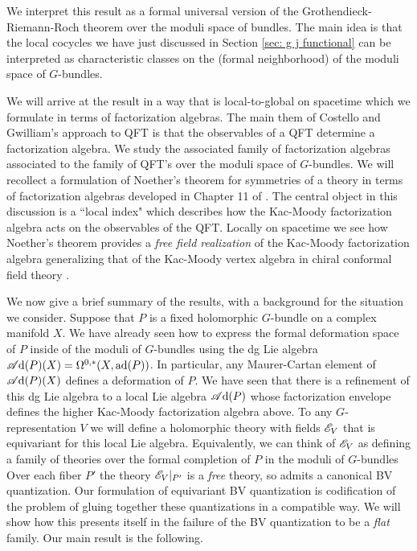 We interpret this result as a formal universal version of the Grothendieck-Riemann-Roch theorem over the moduli space of bundles. 
The main idea is that the local cocycles we have just discussed in Section \ref{sec: g j functional} can be interpreted as characteristic classes on the (formal neighborhood) of the moduli space of $G$-bundles.

We will arrive at the result in a way that is local-to-global on spacetime which we formulate in terms of factorization algebras.
The main them of Costello and Gwilliam's approach to QFT is that the observables of a QFT determine a factorization algebra. 
We study the associated family of factorization algebras associated to the family of QFT's over the moduli space of $G$-bundles.
We will recollect a formulation of Noether's theorem for symmetries of a theory in terms of factorization algebras developed in Chapter 11 of \cite{CG2}. 
The central object in this discussion is a ``local index" which describes how the Kac-Moody factorization algebra acts on the observables of the QFT. 
Locally on spacetime we see how Noether's theorem provides a {\em free field realization} of the Kac-Moody factorization algebra generalizing that of the Kac-Moody vertex algebra in chiral conformal field theory \cite{FrenkelFree}. 

We now give a brief summary of the results, with a background for the situation we consider.
Suppose that $P$ is a fixed holomorphic $G$-bundle on a complex manifold $X$.
We have already seen how to express the formal deformation space of $P$ inside of the moduli of $G$-bundles using the dg Lie algebra $\mathscr A{\rm d}(P)(X) = \Omega^{0,*}(X , {\rm ad} (P))$.
In particular, any Maurer-Cartan element of $\mathscr A{\rm d}(P)(X)$ defines a deformation of $P$. 
We have seen that there is a refinement of this dg Lie algebra to a local Lie algebra $\mathscr A{\rm d}(P)$ whose factorization envelope defines the higher Kac-Moody factorization algebra above.
To any $G$-representation $V$ we will define a holomorphic theory with fields $\mathscr E_V$ that is equivariant for this local Lie algebra. 
Equivalently, we can think of $\mathscr E_V$ as defining a family of theories over the formal completion of $P$ in the moduli of $G$-bundles
\ben
{}
\een
Over each fiber $P'$ the theory $\mathscr E_V|_{P'}$ is a {\em free} theory, so admits a canonical BV quantization. 
Our formulation of equivariant BV quantization is codification of the problem of gluing together these quantizations in a compatible way.
We will show how this presents itself in the failure of the BV quantization to be a {\em flat} family. 
Our main result is the following. 

